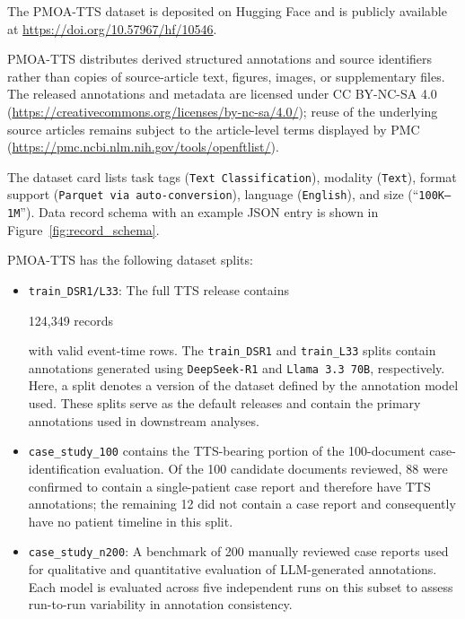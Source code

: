 \documentclass[pdflatex,sn-mathphys-num]{sn-jnl}%
\newif\ifshowrebuttalcolor
\newcommand{\rebuttal}[1]{%
  \ifshowrebuttalcolor
    \textcolor{rebuttalblue}{#1}%
  \else
    #1%
  \fi
}
\theoremstyle{thmstyleone}%
\theoremstyle{thmstyletwo}%
\theoremstyle{thmstylethree}%
\begin{document}
\rebuttal{
The PMOA-TTS dataset is deposited on Hugging Face \cite{shahriar_noroozizadeh_2026} and is publicly available at \url{https://doi.org/10.57967/hf/10546}.
}
\rebuttal{
PMOA-TTS distributes derived structured annotations and source identifiers rather than copies of source-article text, figures, images, or supplementary files. The released annotations and metadata are licensed under CC BY-NC-SA 4.0 (\url{https://creativecommons.org/licenses/by-nc-sa/4.0/}); reuse of the underlying source articles remains subject to the article-level terms displayed by PMC (\url{https://pmc.ncbi.nlm.nih.gov/tools/openftlist/}).
}
The dataset card lists task tags (\texttt{Text Classification}), modality (\texttt{Text}), format support (\texttt{Parquet via auto-conversion}), language (\texttt{English}), and size (``\texttt{100K--1M}''). Data record schema with an example JSON entry is shown in Figure~\ref{fig:record_schema}.

\noindent PMOA-TTS has the following dataset splits:



\begin{itemize}
    \item \texttt{train\_DSR1/L33}: The full TTS release contains \rebuttal{124{,}349 records} with valid event-time rows. The \texttt{train\_DSR1} and \texttt{train\_L33} splits contain annotations generated using \texttt{DeepSeek-R1} and \texttt{Llama 3.3 70B}, respectively. Here, a split denotes a version of the dataset defined by the annotation model used. These splits serve as the default releases and contain the primary annotations used in downstream analyses.
    
    \item \rebuttal{\texttt{case\_study\_100} contains the TTS-bearing portion of the 100-document case-identification evaluation. Of the 100 candidate documents reviewed, 88 were confirmed to contain a single-patient case report and therefore have TTS annotations; the remaining 12 did not contain a case report and consequently have no patient timeline in this split.}
    
    \item \texttt{case\_study\_n200}: A benchmark of 200 manually reviewed case reports used for qualitative and quantitative evaluation of LLM-generated annotations. Each model is evaluated across five independent runs on this subset to assess run-to-run variability in annotation consistency.

\end{itemize}
\end{document}
